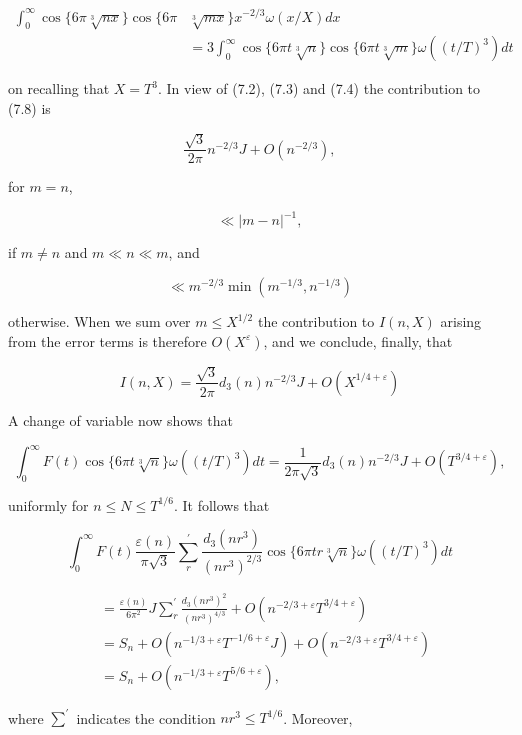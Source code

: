 \documentclass[10pt]{article}
\begin{document}
$$
\begin{aligned}
\int_{0}^{\infty} \cos \{6 \pi \sqrt[3]{n x}\} \cos \{6 \pi & \sqrt[3]{m x}\} x^{-2 / 3} \omega(x / X) d x \\
& =3 \int_{0}^{\infty} \cos \{6 \pi t \sqrt[3]{n}\} \cos \{6 \pi t \sqrt[3]{m}\} \omega\left((t / T)^{3}\right) d t
\end{aligned}
$$

on recalling that $X=T^{3}$. In view of (7.2), (7.3) and (7.4) the contribution to (7.8) is

$$
\frac{\sqrt{3}}{2 \pi} n^{-2 / 3} J+O\left(n^{-2 / 3}\right),
$$

for $m=n$,

$$
\ll|m-n|^{-1},
$$

if $m \neq n$ and $m \ll n \ll m$, and

$$
\ll m^{-2 / 3} \min \left(m^{-1 / 3}, n^{-1 / 3}\right)
$$

otherwise. When we sum over $m \leq X^{1 / 2}$ the contribution to $I(n, X)$ arising from the error terms is therefore $O\left(X^{\varepsilon}\right)$, and we conclude, finally, that

$$
I(n, X)=\frac{\sqrt{3}}{2 \pi} d_{3}(n) n^{-2 / 3} J+O\left(X^{1 / 4+\varepsilon}\right)
$$

A change of variable now shows that

$$
\int_{0}^{\infty} F(t) \cos \{6 \pi t \sqrt[3]{n}\} \omega\left((t / T)^{3}\right) d t=\frac{1}{2 \pi \sqrt{3}} d_{3}(n) n^{-2 / 3} J+O\left(T^{3 / 4+\varepsilon}\right),
$$

uniformly for $n \leq N \leq T^{1 / 6}$. It follows that

$$
\int_{0}^{\infty} F(t) \frac{\varepsilon(n)}{\pi \sqrt{3}} \sum_{r}^{\prime} \frac{d_{3}\left(n r^{3}\right)}{\left(n r^{3}\right)^{2 / 3}} \cos \{6 \pi t r \sqrt[3]{n}\} \omega\left((t / T)^{3}\right) d t
$$

$$
\begin{aligned}
& =\frac{\varepsilon(n)}{6 \pi^{2}} J \sum_{r}^{\prime} \frac{d_{3}\left(n r^{3}\right)^{2}}{\left(n r^{3}\right)^{4 / 3}}+O\left(n^{-2 / 3+\varepsilon} T^{3 / 4+\varepsilon}\right) \\
& =S_{n}+O\left(n^{-1 / 3+\varepsilon} T^{-1 / 6+\varepsilon} J\right)+O\left(n^{-2 / 3+\varepsilon} T^{3 / 4+\varepsilon}\right) \\
& =S_{n}+O\left(n^{-1 / 3+\varepsilon} T^{5 / 6+\varepsilon}\right),
\end{aligned}
$$

where $\sum^{\prime}$ indicates the condition $n r^{3} \leq T^{1 / 6}$. Moreover,
\end{document}
